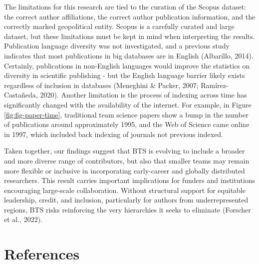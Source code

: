 \documentclass[
  man,floatsintext]{apa7}
\begin{document}
The limitations for this research are tied to the curation of the Scopus
dataset: the correct author affiliations, the correct author publication
information, and the correctly marked geopolitical entity. Scopus is a
carefully curated and large dataset, but these limitations must be kept
in mind when interpreting the results. Publication language diversity
was not investigated, and a previous study indicates that most
publications in big databases are in English (Albarillo, 2014).
Certainly, publications in non-English languages would improve the
statistics on diversity in scientific publishing - but the English
language barrier likely exists regardless of inclusion in databases
(Meneghini \& Packer, 2007; Ramírez-Castañeda, 2020). Another limitation is the process of indexing across time has significantly changed with the availability of the internet. For example, in Figure \ref{fig:fig-paper-time}, traditional team science papers show a bump in the number of publications around approximately 1995, and the Web of Science came online in 1997, which included back indexing of journals not previous indexed.

Taken together, our findings suggest that BTS is evolving to include a
broader and more diverse range of contributors, but also that smaller
teams may remain more flexible or inclusive in incorporating
early-career and globally distributed researchers. This result carries
important implications for funders and institutions encouraging
large-scale collaboration. Without structural support for equitable
leadership, credit, and inclusion, particularly for authors from
underrepresented regions, BTS risks reinforcing the very hierarchies it
seeks to eliminate (Forscher et al., 2022).

\newpage

\section{References}\label{references}
\end{document}
